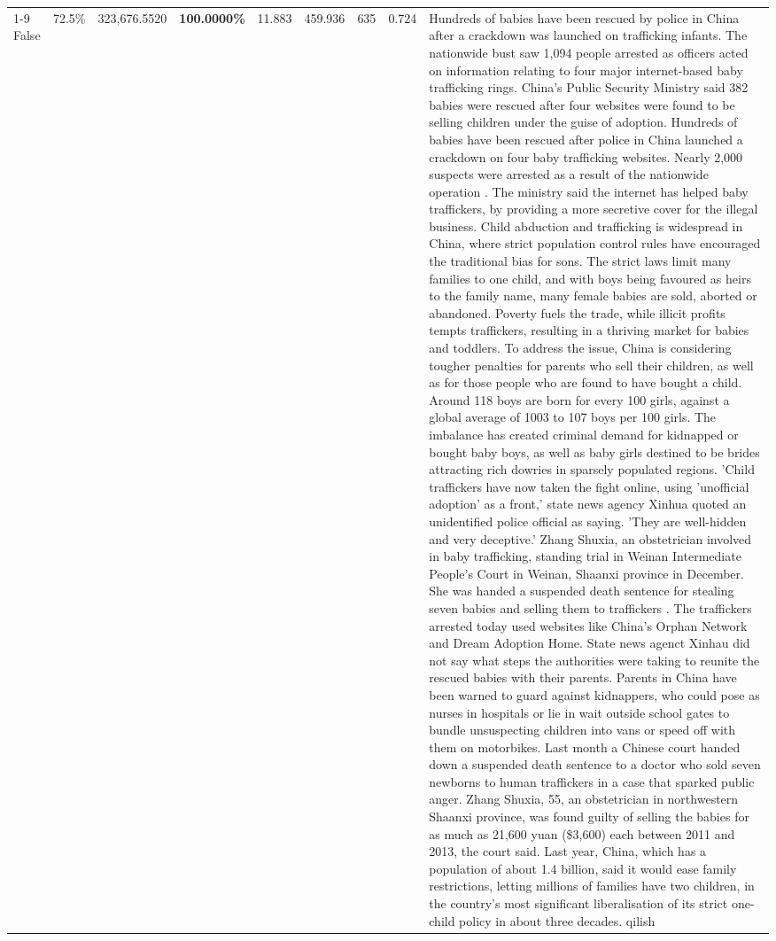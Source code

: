 \begin{table}[H]
\begin{tabular}{lllrlllll}
\cline{1-9}
False & 72.5\% & 323,676.5520 & \bfseries \color{red} 100.0000\% & 11.883 & 459.936 & 635 & 0.724 & Hundreds of babies have been rescued by police in China after a crackdown was launched on trafficking infants. The nationwide bust saw 1,094 people arrested as officers acted on information relating to four major internet-based baby trafficking rings. China's Public Security Ministry said 382 babies were rescued after four websites were found to be selling children under the guise of adoption. Hundreds of babies have been rescued after police in China launched a crackdown on four baby trafficking websites. Nearly 2,000 suspects were arrested as a result of the nationwide operation . The ministry said the internet has helped baby traffickers, by providing a more secretive cover for the illegal business. Child abduction and trafficking is widespread in China, where strict population control rules have encouraged the traditional bias for sons. The strict laws limit many families to one child, and with boys being favoured as heirs to the family name, many female babies are sold, aborted or abandoned. Poverty fuels the trade, while illicit profits tempts traffickers, resulting in a thriving market for babies and toddlers. To address the issue, China is considering tougher penalties for parents who sell their children, as well as for those people who are found to have bought a child. Around 118 boys are born for every 100 girls, against a global average of 1003 to 107 boys per 100 girls. The imbalance has created criminal demand for kidnapped or bought baby boys, as well as baby girls destined to be brides attracting rich dowries in sparsely populated regions. 'Child traffickers have now taken the fight online, using 'unofficial adoption' as a front,' state news agency Xinhua quoted an unidentified police official as saying. 'They are well-hidden and very deceptive.' Zhang Shuxia, an obstetrician involved in baby trafficking, standing trial in Weinan Intermediate People's Court in Weinan, Shaanxi province in December. She was handed a suspended death sentence for stealing seven babies and selling them to traffickers . The traffickers arrested today used websites like China's Orphan Network and Dream Adoption Home. State news agenct Xinhau did not say what steps the authorities were taking to reunite the rescued babies with their parents. Parents in China have been warned to guard against kidnappers, who could pose as nurses in hospitals or lie in wait outside school gates to bundle unsuspecting children into vans or speed off with them on motorbikes. Last month a Chinese court handed down a suspended death sentence to a doctor who sold seven newborns to human traffickers in a case that sparked public anger. Zhang Shuxia, 55, an obstetrician in northwestern Shaanxi province, was found guilty of selling the babies for as much as 21,600 yuan (\$3,600) each between 2011 and 2013, the court said. Last year, China, which has a population of about 1.4 billion, said it would ease family restrictions, letting millions of families have two children, in the country's most significant liberalisation of its strict one-child policy in about three decades. qilish \\

\end{tabular}
\end{table}

